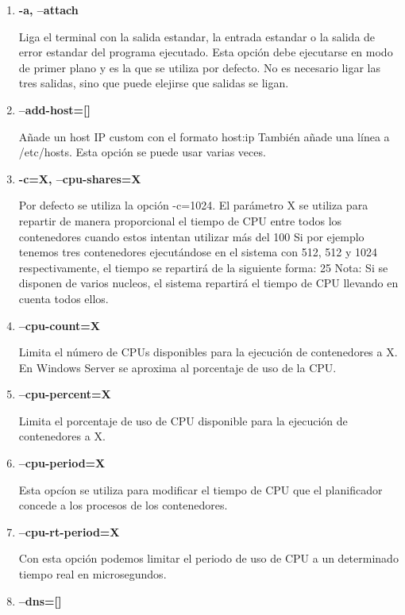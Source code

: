 \documentclass[]{article}
\begin{document}
\begin{enumerate}
\renewcommand{\labelenumi}{$ \bullet $}

\item {\bf -a, --attach}

			Liga el terminal con la salida estandar, la entrada estandar o la salida de error estandar del programa ejecutado.
			Esta opción debe ejecutarse en modo de primer plano y es la que se utiliza por defecto.
			No es necesario ligar las tres salidas, sino que puede elejirse que salidas se ligan.
	
\item {\bf --add-host=[]}
	
			Añade un host IP custom con el formato host:ip
			También añade una línea a /etc/hosts.
			Esta opción se puede usar varias veces.
	
\item {\bf -c=X, --cpu-shares=X}
	
			Por defecto se utiliza la opción -c=1024.
			El parámetro X se utiliza para repartir de manera proporcional el tiempo de CPU entre todos los contenedores cuando estos intentan utilizar más del 100%
			Si por ejemplo tenemos tres contenedores ejecutándose en el sistema con 512, 512 y 1024 respectivamente, el tiempo se repartirá de la siguiente forma: 25%
			Nota: Si se disponen de varios nucleos, el sistema repartirá el tiempo de CPU llevando en cuenta todos ellos.
	
	
\item {\bf --cpu-count=X}
	
			Limita el número de CPUs disponibles para la ejecución de contenedores a X.
			En Windows Server se aproxima al porcentaje de uso de la CPU.
	
\item {\bf --cpu-percent=X}
	
			Limita el porcentaje de uso de CPU disponible para la ejecución de contenedores a X.
	
\item {\bf --cpu-period=X}
	
			Esta opcíon se utiliza para modificar el tiempo de CPU que el planificador concede a los procesos de los contenedores.
	
\item {\bf --cpu-rt-period=X}
	
			Con esta opción podemos limitar el periodo de uso de CPU a un determinado tiempo real en microsegundos.
	
\item {\bf --dns=[]}
	

\end{enumerate}
\end{document}
